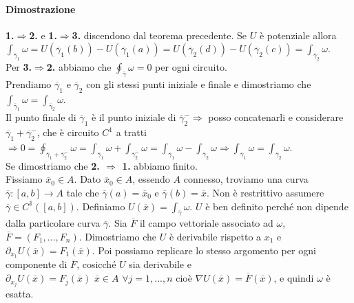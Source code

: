 \documentclass{article}
\begin{document}
\paragraph{{Dimostrazione}}
\textbf{1.$\Rightarrow $2.} e \textbf{1.$\Rightarrow $3.} discendono dal teorema precedente. Se $U$ è potenziale allora\\
$\int_{\overline{\gamma}_1}\omega=U(\overline{\gamma}_1(b))-U(\overline{\gamma}_1(a))=U(\overline{\gamma}_2(d))-U(\overline{\gamma}_2(c))=\int_{\overline{\gamma}_2}\omega$.\\
Per \textbf{3.$\Rightarrow$2.} abbiamo che $\oint_{\overline{\gamma}}\omega =0$ per ogni circuito.\\
Prendiamo $\overline{\gamma}_1$ e $\overline{\gamma}_2$ con gli stessi punti iniziale e finale e dimostriamo che $\int_{\overline{\gamma}_1}\omega=\int_{\overline{\gamma}_2}\omega$.\\
Il punto finale di $\overline{\gamma}_1$ è il punto iniziale di $\overline{\gamma}_2^- \Rightarrow$ posso concatenarli e considerare $\overline{\gamma}_1+\overline{\gamma}_2^-$, che è circuito $C^1$ a tratti 
$\Rightarrow 0 =\oint_{\overline{\gamma}_1+\overline{\gamma}_2^-}\omega=\int_{\overline{\gamma}_1}\omega+\int_{\overline{\gamma}_2^-}\omega= \int_{\overline{\gamma}_1}\omega - \int_{\overline{\gamma}_2}\omega\Rightarrow \int_{\overline{\gamma}_1}\omega = \int_{\overline{\gamma}_2}\omega$.\\
Se dimostriamo che \textbf{2. $\Rightarrow$ 1.} abbiamo finito.\\
Fissiamo $\overline{x}_0\in A$. Dato $\overline{x}_0 \in A$,  essendo $A$ connesso, troviamo una curva $\overline{\gamma}:[a,b]\rightarrow A$ tale che $\overline{\gamma}(a)=\overline{x}_0$ e $\overline{\gamma}(b)=\overline{x}$. Non è restrittivo assumere $\overline{\gamma}\in C^1([a,b])$. Definiamo $U(\overline{x})=\int_{\overline{\gamma}}\omega$. $U $ è ben definito perché non dipende dalla particolare curva $\overline{\gamma}$. Sia $\overline{F}$ il campo vettoriale associato ad $\omega$, $\overline{F}=(F_1,...,F_n)$. Dimostriamo che $U$ è derivabile rispetto a $x_1$ e $\partial_{x_1}U(\overline{x})=F_1(\overline{x})$. Poi possiamo replicare lo stesso argomento per ogni componente di $\overline{F}$, cosicché $U$ sia derivabile e $\partial_{x_j}U(\overline{x})=F_j(\overline{x})\,\, \overline{x}\in A\,\, \forall j=1,...,n$ cioè $\nabla U(\overline{x})=\overline{F}(\overline{x})$, e quindi $\omega$ è esatta.\\
\end{document}
